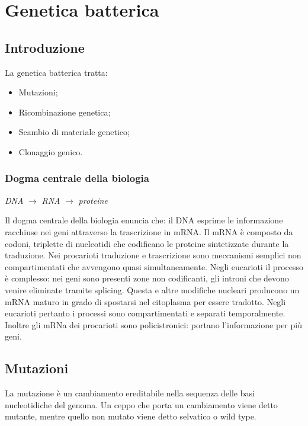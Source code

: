\chapter{Genetica batterica}
	
\section{Introduzione}
La genetica batterica tratta: 
\begin{multicols}{2}
	\begin{itemize}
	    \item Mutazioni; 
	    \item Ricombinazione genetica; 
	    \item Scambio di materiale genetico; 
	    \item Clonaggio genico.
	\end{itemize}
\end{multicols}

	\subsection{Dogma centrale della biologia}
	\begin{center}
		\emph{DNA} $\rightarrow$ \emph{RNA} $\rightarrow$ \emph{proteine}
	\end{center}
	Il dogma centrale della biologia enuncia che: il DNA esprime le informazione racchiuse nei geni attraverso la trascrizione in mRNA. 
	Il mRNA \`e composto da codoni, triplette di nucleotidi che codificano le proteine sintetizzate durante la traduzione.
	Nei procarioti traduzione e trascrizione sono meccanismi semplici non compartimentati che avvengono quasi simultaneamente.
	Negli eucarioti il processo \`e complesso: nei geni sono presenti zone non codificanti, gli introni che devono venire eliminate tramite splicing.
	Questa e altre modifiche nucleari producono un mRNA maturo in grado di spostarsi nel citoplasma per essere tradotto.
	Negli eucarioti pertanto i processi sono compartimentati e separati temporalmente.
	Inoltre gli mRNa dei procarioti sono policistronici: portano l'informazione per pi\`u geni.

\section{Mutazioni}
La mutazione è un cambiamento ereditabile nella sequenza delle basi nucleotidiche del genoma. 
Un ceppo che porta un cambiamento viene detto mutante, mentre quello non mutato viene detto selvatico o wild type. 

